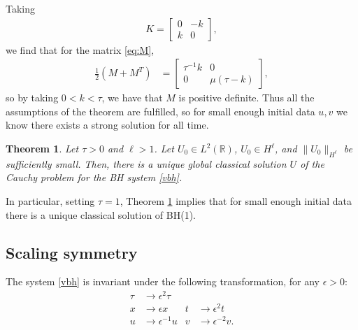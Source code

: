 \documentclass{article}
\theoremstyle{plain}
\newtheorem{theorem}{Theorem}
\theoremstyle{definition}
\numberwithin{theorem}{section}
\begin{document}
Taking
\begin{align*}
    K = \begin{bmatrix} 0 & -k \\ k & 0 \end{bmatrix},
\end{align*}
we find that for the matrix \eqref{eq:M},
\begin{align}
    \frac{1}{2}\left(M + M^T\right) & = \begin{bmatrix} \tau^{-1} k & 0 \\ 0 & \mu(\tau-k) \end{bmatrix},
\end{align}
so by taking $0 < k < \tau$, we have that $M$ is positive definite.  Thus all the assumptions
of the theorem are fulfilled, so for small enough initial data $u, v$ we know there exists
a strong solution for all time.

\begin{theorem}
\label{thm:burgers_small_data}
    Let
    $\tau > 0$ and $\ell > 1$.
    Let $U_0 \in L^2(\mathbb{R})$,
    $U_0 \in H^\ell$, and $\|U_0\|_{H^\ell}$ be sufficiently small.
    Then, there is a unique global classical solution $U$ of the Cauchy problem for the BH system \eqref{vbh}.
\end{theorem}
In particular, setting $\tau=1$, Theorem \ref{thm:burgers_small_data} implies that for small
enough initial data there is a unique classical solution  of BH(1).


\subsection{Scaling symmetry}
The system \eqref{vbh} is invariant under the following transformation, for any $\epsilon>0$:
\begin{subequations}
\label{vbh-scaling}
\begin{align}
    \tau & \to \epsilon^2 \tau \\
    x & \to \epsilon x & t & \to \epsilon^2 t \\
    u & \to \epsilon^{-1} u & v & \to \epsilon^{-2} v.
\end{align}
\end{subequations}
\end{document}
